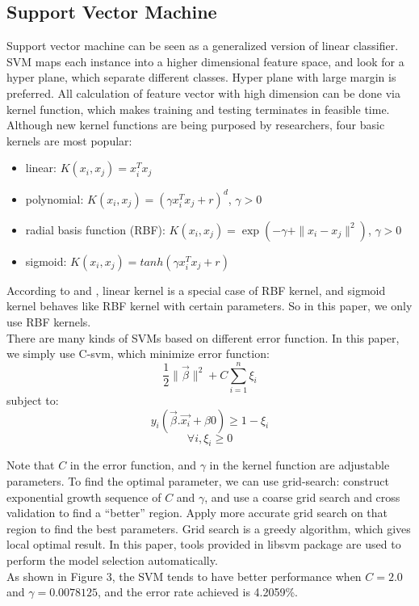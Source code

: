 \documentclass[a4paper,11pt]{article}
\begin{document}
\subsection{Support Vector Machine}
Support vector machine can be seen as a generalized version of linear classifier. SVM maps each instance into a higher dimensional feature space, and look for a hyper plane, which separate different classes. Hyper plane with large margin is preferred. All calculation of feature vector with high dimension can be done via kernel function, which makes training and testing terminates in feasible time. Although new kernel functions are being purposed by researchers, four basic kernels are most popular\cite{SVM}:
\begin{itemize}
\item linear: $K(x_i,x_j)=x_i^Tx_j$\\
\item polynomial: $K(x_i,x_j)=(\gamma x_i^Tx_j+r)^d$, $\gamma >0$\\
\item radial basis function (RBF): $K(x_i,x_j)=\exp(-\gamma + \|x_i-x_j\|^2)$, $\gamma > 0$\\
\item sigmoid: $K(x_i,x_j)=tanh(\gamma x_i^Tx_j+r)$\\
\end{itemize}
According to \cite{SSK} and \cite{LL}, linear kernel is a special case of RBF kernel, and sigmoid kernel behaves like RBF kernel with certain parameters. So in this paper, we only use RBF kernels.\\
There are many kinds of SVMs based on different error function. In this paper, we simply use C-svm, which minimize error function:
    $$\frac{1}{2}\|\vec{\beta}\|^2+C\sum_{i=1}^n \xi_i$$
 subject to:$$y_i(\vec{\beta}.\vec{x_i}+\beta{0})\geq 1-\xi_i$$$$\forall i, \xi_i\geq 0$$

Note that $C$ in the error function, and $\gamma$ in the kernel function are adjustable parameters. To find the optimal parameter, we can use grid-search\cite{SVM}: construct exponential growth sequence of $C$ and $\gamma$, and use a coarse grid search and cross validation to find a ``better'' region. Apply more accurate grid search on that region to find the best parameters. Grid search is a greedy algorithm, which gives local optimal result. In this paper, tools provided in libsvm\cite{LIBSVM} package are used to perform the model selection automatically.\\
As shown in Figure 3, the SVM tends to have better performance when $C=2.0$ and $\gamma=0.0078125$, and the error rate achieved is 4.2059\%.
\end{document}
